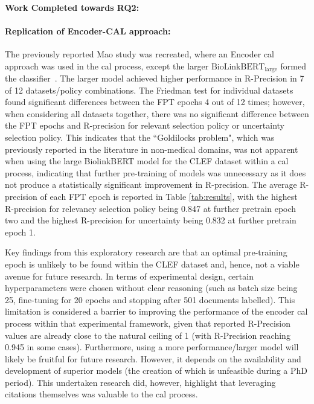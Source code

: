 \documentclass[10pt,oneside]{book}
\begin{document}
\paragraph{Work Completed towards RQ2: }

\paragraph{Replication of Encoder-CAL approach: }
The previously reported Mao study was recreated, where an Encoder \gls*{cal} approach was used in the \gls*{cal} process, except the larger $\text{BioLinkBERT}_{\text{large}}$ formed the classifier~\cite{mao_reproducibility_2024}. The larger model achieved higher performance in R-Precision in 7 of 12 datasets/policy combinations. The Friedman test for individual datasets found significant differences between the FPT epochs 4 out of 12 times; however, when considering all datasets together, there was no significant difference between the FPT epochs and R-precision for relevant selection policy or uncertainty selection policy. This indicates that the ``Goldilocks problem", which was previously reported in the literature in non-medical domains, was not apparent when using the large BiolinkBERT model for the CLEF dataset within a \gls*{cal} process, indicating that further pre-training of models was unnecessary as it does not produce a statistically significant improvement in R-precision. The average R-precision of each FPT epoch is reported in Table \ref{tab:results}, with the highest R-precision for relevancy selection policy being 0.847 at further pretrain epoch two and the highest R-precision for uncertainty being 0.832 at further pretrain epoch 1.

Key findings from this exploratory research are that an optimal pre-training epoch is unlikely to be found within the CLEF dataset and, hence, not a viable avenue for future research. In terms of experimental design, certain hyperparameters
were chosen without clear reasoning (such as batch size being 25, fine-tuning for 20 epochs and stopping after 501 documents labelled). This limitation is considered a barrier to improving the performance of the encoder \gls*{cal} process within that experimental framework, given that reported R-Precision values are already close to the natural ceiling of 1 (with R-Precision reaching 0.945 in some cases). Furthermore, using a more performance/larger model will likely be fruitful for future research. However, it depends on the availability and development of superior models (the creation of which is unfeasible during a PhD period). This undertaken research did, however, highlight that leveraging citations themselves was valuable to the \gls*{cal} process. 
\end{document}
